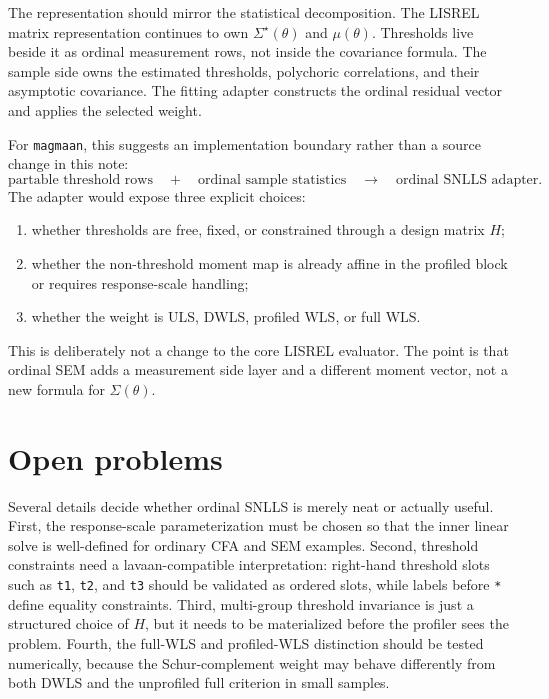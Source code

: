 \documentclass[11pt]{article}
\newcommand{\magmaan}{\texttt{magmaan}}
\newcommand{\ULS}{\mathrm{ULS}}
\newcommand{\DWLS}{\mathrm{DWLS}}
\newcommand{\WLS}{\mathrm{WLS}}
\begin{document}
The representation should mirror the statistical decomposition. The LISREL
matrix representation continues to own \(\Sigma^\star(\theta)\) and
\(\mu(\theta)\). Thresholds live beside it as ordinal measurement rows, not
inside the covariance formula. The sample side owns the estimated thresholds,
polychoric correlations, and their asymptotic covariance. The fitting adapter
constructs the ordinal residual vector and applies the selected weight.

For \magmaan{}, this suggests an implementation boundary rather than a source
change in this note:
\[
  \text{partable threshold rows}
  \quad+\quad
  \text{ordinal sample statistics}
  \quad\longrightarrow\quad
  \text{ordinal SNLLS adapter}.
\]
The adapter would expose three explicit choices:
\begin{enumerate}
\item whether thresholds are free, fixed, or constrained through a design
  matrix \(H\);
\item whether the non-threshold moment map is already affine in the profiled
  block or requires response-scale handling;
\item whether the weight is \(\ULS\), \(\DWLS\), profiled \(\WLS\), or full
  \(\WLS\).
\end{enumerate}
This is deliberately not a change to the core LISREL evaluator. The point is
that ordinal SEM adds a measurement side layer and a different moment vector,
not a new formula for \(\Sigma(\theta)\).

\section{Open problems}
\label{sec:open}

Several details decide whether ordinal SNLLS is merely neat or actually useful.
First, the response-scale parameterization must be chosen so that the inner
linear solve is well-defined for ordinary CFA and SEM examples. Second,
threshold constraints need a lavaan-compatible interpretation: right-hand
threshold slots such as \texttt{t1}, \texttt{t2}, and \texttt{t3} should be
validated as ordered slots, while labels before \texttt{*} define equality
constraints. Third, multi-group threshold invariance is just a structured
choice of \(H\), but it needs to be materialized before the profiler sees the
problem. Fourth, the full-WLS and profiled-WLS distinction should be tested
numerically, because the Schur-complement weight may behave differently from
both DWLS and the unprofiled full criterion in small samples.
\end{document}
